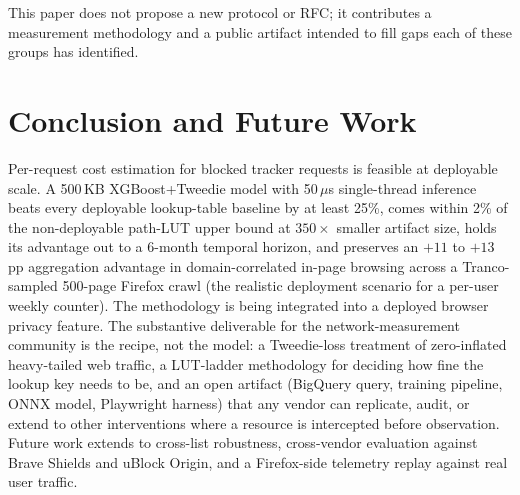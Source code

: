 \documentclass[10pt,sigconf,letterpaper,anonymous]{acmart}
\begin{document}
This paper does not propose a new protocol or RFC; it contributes a measurement methodology and a public artifact intended to fill gaps each of these groups has identified.

\section{Conclusion and Future Work}
\label{sec:conclusion}

Per-request cost estimation for blocked tracker requests is feasible at deployable scale. A 500\,KB XGBoost+Tweedie model with 50\,$\mu$s single-thread inference beats every deployable lookup-table baseline by at least 25\%, comes within 2\% of the non-deployable path-LUT upper bound at $350\times$ smaller artifact size, holds its advantage out to a 6-month temporal horizon, and preserves an $+11$ to $+13$\,pp aggregation advantage in domain-correlated in-page browsing across a Tranco-sampled 500-page Firefox crawl (the realistic deployment scenario for a per-user weekly counter). The methodology is being integrated into a deployed browser privacy feature.
The substantive deliverable for the network-measurement community is the recipe, not the model: a Tweedie-loss treatment of zero-inflated heavy-tailed web traffic, a LUT-ladder methodology for deciding how fine the lookup key needs to be, and an open artifact (BigQuery query, training pipeline, ONNX model, Playwright harness) that any vendor can replicate, audit, or extend to other interventions where a resource is intercepted before observation.
Future work extends to cross-list robustness, cross-vendor evaluation against Brave Shields and uBlock Origin, and a Firefox-side telemetry replay against real user traffic.



\end{document}
